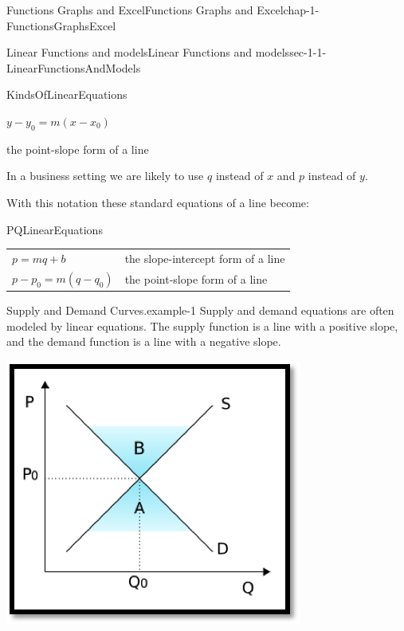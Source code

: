 \documentclass[oneside,10pt,]{book}
\numberwithin{equation}{section}
\begin{document}
\begin{chapterptx}{Functions Graphs and Excel}{}{Functions Graphs and Excel}{}{}{chap-1-FunctionsGraphsExcel}
\begin{sectionptx}{Linear Functions and models}{}{Linear Functions and models}{}{}{sec-1-1-LinearFunctionsAndModels}
\begin{assemblage}{}{KindsOfLinearEquations}
\begin{sidebyside}{2}{0}{0}{0}
\begin{sbspanel}{0.4}
\(y-y_0=m(x-x_0)\)%
\end{sbspanel}%
\begin{sbspanel}{0.6}%
\par
\hypertarget{p-36}{}%
the point-slope form of a line%
\end{sbspanel}%
\end{sidebyside}%
\end{assemblage}
\hypertarget{p-37}{}%
In a business setting we are likely to use \(q\) instead of \(x\) and \(p\) instead of \(y\).%
\par
\hypertarget{p-38}{}%
With this notation these standard equations of a line become:%
\begin{assemblage}{}{PQLinearEquations}%
\leavevmode%
\begin{sidebyside}{1}{0}{0}{0}%
\begin{sbspanel}{1}%
{\centering%
\begin{tabular}{ll}
\(p=m q+b\)&the slope-intercept form of a line\tabularnewline[0pt]
\(p-p_0=m(q-q_0)\)&the point-slope form of a line
\end{tabular}
\par}
\end{sbspanel}%
\end{sidebyside}%
\end{assemblage}
\begin{example}{Supply and Demand Curves.}{example-1}%
\hypertarget{p-39}{}%
Supply and demand equations are often modeled by linear equations. The supply function is a line with a positive slope, and the demand function is a line with a negative slope.%
\begin{sidebyside}{1}{0.25}{0.25}{0}%
\begin{sbspanel}{0.5}%
\includegraphics[width=1\linewidth]{images/sec1-1-SDcurves.png}

\end{sbspanel}
\end{sidebyside}
\end{example}
\end{sectionptx}
\end{chapterptx}
\end{document}
